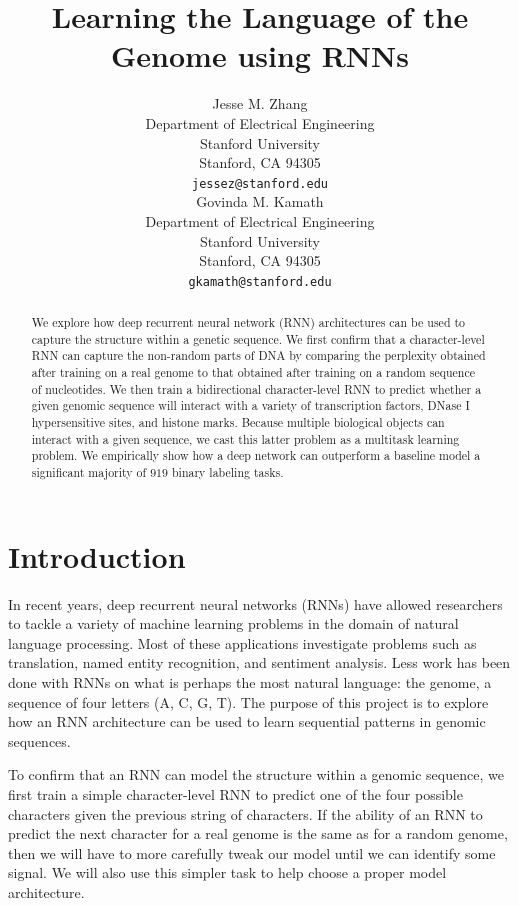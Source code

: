 \documentclass{article} %
\title{Learning the Language of the Genome using RNNs}
\author{
Jesse M. Zhang \\
Department of Electrical Engineering \\
Stanford University \\
Stanford, CA 94305 \\
\texttt{jessez@stanford.edu} \\
\And
Govinda M. Kamath \\
Department of Electrical Engineering\\
Stanford University\\
Stanford, CA 94305 \\
\texttt{gkamath@stanford.edu} \\
}
\begin{document}
\maketitle

\begin{abstract}
We explore how deep recurrent neural network (RNN) architectures can be used to capture the structure within a genetic sequence. We first confirm that a character-level RNN can capture the non-random parts of DNA by comparing the perplexity obtained after training on a real genome to that obtained after training on a random sequence of nucleotides. We then train a bidirectional character-level RNN to predict whether a given genomic sequence will interact with a variety of transcription factors, DNase I hypersensitive sites, and histone marks. Because multiple biological objects can interact with a given sequence, we cast this latter problem as a multitask learning problem. We empirically show how a deep network can outperform a baseline model a significant majority of $919$ binary labeling tasks. 
\end{abstract}

\section{Introduction}
In recent years, deep recurrent neural networks (RNNs) have allowed researchers to tackle a variety of machine learning problems in the domain of natural language processing. Most of these applications investigate problems such as translation, named entity recognition, and sentiment analysis. Less work has been done with RNNs on what is perhaps the most natural language: the genome, a sequence of four letters (A, C, G, T). The purpose of this project is to explore how an RNN architecture can be used to learn sequential patterns in genomic sequences.

To confirm that an RNN can model the structure within a genomic sequence, we first train a simple character-level RNN to predict one of the four possible characters given the previous string of characters. If the ability of an RNN to predict the next character for a real genome is the same as for a random genome, then we will have to more carefully tweak our model until we can identify some signal. We will also use this simpler task to help choose a proper model architecture.
\end{document}
